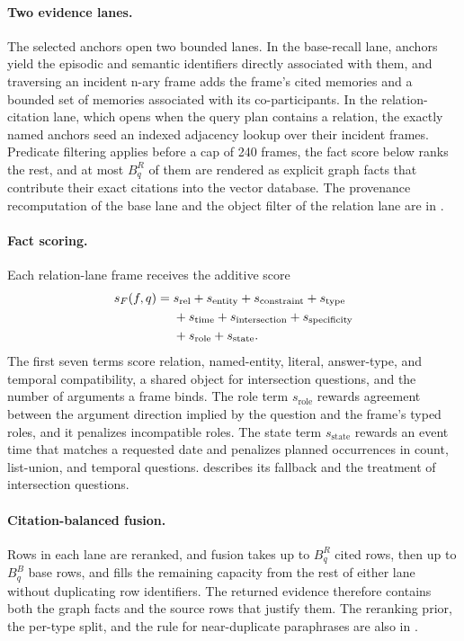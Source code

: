 \paragraph{Two evidence lanes.}
The selected anchors open two bounded lanes. In the base-recall lane, anchors
yield the episodic and semantic identifiers directly associated with them, and
traversing an incident n-ary frame adds the frame's cited memories and a bounded
set of memories associated with its co-participants. In the relation-citation
lane, which opens when the query plan contains a relation, the exactly named anchors seed an indexed adjacency lookup over their incident
frames. Predicate filtering applies before a cap of 240 frames, the fact score
below ranks the rest, and at most \(B_q^R\) of them are rendered as explicit
graph facts that contribute their exact citations into the vector database. The provenance
recomputation of the base lane and the object filter of the relation lane are
in .

\paragraph{Fact scoring.}
Each relation-lane frame receives the additive score
\begin{align}
    s_F(f,q)={}&
    s_{\mathrm{rel}}+s_{\mathrm{entity}}+s_{\mathrm{constraint}}
    +s_{\mathrm{type}} \notag\\
    &+s_{\mathrm{time}}+s_{\mathrm{intersection}}
    +s_{\mathrm{specificity}} \notag\\
    &+s_{\mathrm{role}}+s_{\mathrm{state}}.
    \label{eq:fact-score}
\end{align}
The first seven terms score relation, named-entity, literal, answer-type, and
temporal compatibility, a shared object for intersection questions, and the
number of arguments a frame binds. The role term \(s_{\mathrm{role}}\) rewards agreement
between the argument direction implied by the question and the frame's typed
roles, and it penalizes incompatible roles. The state term \(s_{\mathrm{state}}\)
rewards an event time that matches a requested date and penalizes planned
occurrences in count, list-union, and temporal questions.
 describes its fallback and the treatment of intersection questions.

\paragraph{Citation-balanced fusion.}
Rows in each lane are reranked, and fusion takes up to \(B_q^R\) cited rows,
then up to \(B_q^B\) base rows, and fills the remaining capacity from the rest
of either lane without duplicating row identifiers. The returned evidence
therefore contains both the graph facts and the source rows that justify them.
The reranking prior, the per-type split, and the rule for near-duplicate paraphrases are also in .

